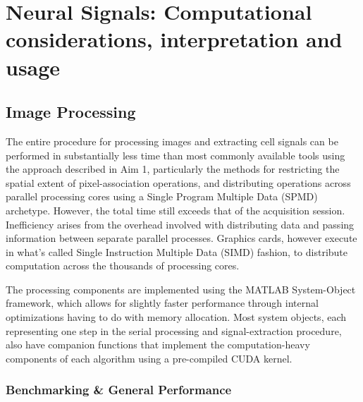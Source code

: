 \documentclass[
  12pt,
]{report}
\numberwithin{figure}{section}
\numberwithin{table}{section}
\numberwithin{equations}{section}
\begin{document}
\hypertarget{neural-signals-computational-considerations-interpretation-and-usage}{%
\chapter{Neural Signals: Computational considerations, interpretation
and
usage}\label{neural-signals-computational-considerations-interpretation-and-usage}}

\hypertarget{image-processing}{%
\section{Image Processing}\label{image-processing}}

The entire procedure for processing images and extracting cell signals
can be performed in substantially less time than most commonly available
tools using the approach described in Aim 1, particularly the methods
for restricting the spatial extent of pixel-association operations, and
distributing operations across parallel processing cores using a Single
Program Multiple Data (SPMD) archetype. However, the total time still
exceeds that of the acquisition session. Inefficiency arises from the
overhead involved with distributing data and passing information between
separate parallel processes. Graphics cards, however execute in what's
called Single Instruction Multiple Data (SIMD) fashion, to distribute
computation across the thousands of processing cores.

The processing components are implemented using the MATLAB System-Object
framework, which allows for slightly faster performance through internal
optimizations having to do with memory allocation. Most system objects,
each representing one step in the serial processing and
signal-extraction procedure, also have companion functions that
implement the computation-heavy components of each algorithm using a
pre-compiled CUDA kernel.

\hypertarget{benchmarking-general-performance}{%
\subsection{Benchmarking \& General
Performance}\label{benchmarking-general-performance}}
\end{document}
